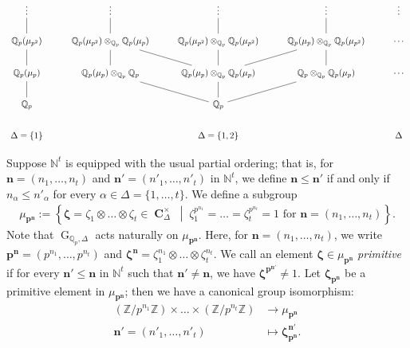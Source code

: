 \documentclass{amsart}
\newcommand{\bn}{\textbf{n}}
\newcommand{\bp}{\textbf{p}}
\DeclareMathOperator{\C}{\textbf{C}}
\DeclareMathOperator{\G}{G}
\begin{document}
{\small
\[
\begin{tikzcd}
    \vdots    &  \vdots & \vdots & \vdots & \vdots\\
    \mathbb{Q}_p(\mu_{p^2})\arrow[u,dash]  & \mathbb{Q}_p(\mu_{p^2})\otimes_{\mathbb{Q}_p}\mathbb{Q}_p(\mu_{p})\arrow[u,dash] & \mathbb{Q}_p(\mu_{p^2})\otimes_{\mathbb{Q}_p}\mathbb{Q}_p(\mu_{p^2})\arrow[u,dash] & \mathbb{Q}_p(\mu_{p})\otimes_{\mathbb{Q}_p}\mathbb{Q}_p(\mu_{p^2})\arrow[u,dash] &\cdots\\
    \mathbb{Q}_p(\mu_{p})\arrow[u,dash]  & \mathbb{Q}_p(\mu_p)\otimes_{\mathbb{Q}_p}\mathbb{Q}_p \arrow[u,dash] & \mathbb{Q}_p(\mu_{p})\otimes_{\mathbb{Q}_p}\mathbb{Q}_p(\mu_{p})\arrow[ul,dash]\arrow[ur,dash]\arrow[u,dash]& \mathbb{Q}_p\otimes_{\mathbb{Q}_p}\mathbb{Q}_p(\mu_p) \arrow[u,dash] & \cdots\\
    \mathbb{Q}_p\arrow[u,dash] & & \mathbb{Q}_p\arrow[ul,dash]\arrow[u,dash]\arrow[ur,dash]\\
    \Delta=\{1\}  &  & \Delta=\{1,2\} & & \Delta
\end{tikzcd}
\]
}

Suppose $\mathbb{N}^t$ is equipped with the usual partial ordering; that is, for $\bn=(n_1,\dots,n_t)$ and $\bn'=(n'_1,\dots,n'_t)$ in $\mathbb{N}^t$, we define $\bn\leq \bn'$ if and only if $n_\alpha\leq n'_\alpha$ for every $\alpha \in \Delta=\{1,\dots,t\}$. We define a subgroup
\begin{align*}
    \mu_{\bp^{\bn}} := \left\{ \boldsymbol\zeta = \zeta_1 \otimes \dots \otimes \zeta_t \in \C^\times_\Delta \;\middle|\; \zeta_1^{p^{n_1}} = \dots = \zeta_t^{p^{n_t}} = 1 \text{ for } \bn=(n_1,\dots,n_t) \right\}.
\end{align*}
Note that $\G_{\mathbb{Q}_p,\Delta}$ acts naturally on $\mu_{\bp^{\bn}}$. Here, for $\bn=(n_1,\dots,n_t)$, we write $\bp^{\bn}=(p^{n_1},\dots,p^{n_t})$ and $\boldsymbol{\zeta}^{\bn}=\zeta_1^{n_1}\otimes\dots\otimes\zeta_t^{n_t}$. We call an element $\boldsymbol\zeta \in \mu_{\bp^{\bn}}$ \emph{primitive} if for every $\bn' \leq \bn$ in $\mathbb{N}^t$ such that $\bn' \neq \bn$, we have $\boldsymbol\zeta^{\bp^{\bn'}} \neq 1$. Let $\boldsymbol\zeta_{\bp^\bn}$ be a primitive element in $\mu_{\bp^{\bn}}$; then we have a canonical group isomorphism:
\begin{align*}
    (\mathbb{Z}/p^{n_1}\mathbb{Z}) \times \dots \times (\mathbb{Z}/{p^{n_t}\mathbb{Z}}) &\to \mu_{\bp^{\bn}} \\
    \bn' = (n'_1, \dots, n'_t) &\mapsto \boldsymbol{\zeta}^{\bn'}_{\bp^{\bn}}.
\end{align*}
\end{document}
